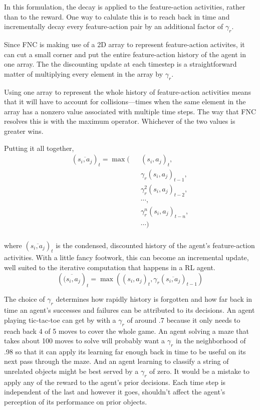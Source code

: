 In this formulation, the decay is applied to the feature-action activities,
rather than to the reward. One way to calulate this is to
reach back in time and incrementally
decay every feature-action pair by an additional factor of $\gamma_r$.

Since FNC is making use of a 2D array to represent
feature-action activites, it can cut a small corner and put the
entire feature-action history of the agent in one array. The the discounting
update at each timestep is a straightforward matter of multiplying
every element in the array by $\gamma_r$.

Using one array to represent the whole history of feature-action activities
means that it will have to account for collisions---times when the same
element in the array has a nonzero value associated with multiple time steps.
The way that FNC resolves this is with the maximum operator. Whichever
of the two values is greater wins.

Putting it all together, 
\begin{eqnarray*}
(\overline{s_i, a_j})_t = \max(&&(s_i, a_j)_t , \\
&&\gamma_r (s_i, a_j)_{t-1},\\
&&\gamma_r^2 (s_i, a_j)_{t-2},\\
&&\cdots,\\
&&\gamma_r^n (s_i, a_j)_{t-n},\\
&&\cdots)\\
\end{eqnarray*}

where $(\overline{s_i, a_j})_t$ is the condensed, discounted history
of the agent's feature-action activities. With a little fancy footwork,
this can become an incremental update, well suited to the iterative computation
that happens in a RL agent.
\begin{equation}
(\overline{(s_i, a_j})_t = \max(
(s_i, a_j)_t , 
\gamma_r (\overline{s_i, a_j})_{t-1})
\end{equation}

The choice of $\gamma_r$ determines how rapidly history is forgotten and
how far back in time an agent's successes and failures can be attributed to its
decisions. An agent playing tic-tac-toe can get by with a $\gamma_r$
of around .7 because it only needs to reach back 4 of 5 moves to cover the
whole game.
An agent solving a maze that takes about 100 moves to solve will
probably want a $\gamma_r$ in the neighborhood of .98 so that it can apply
its learning far enough back in time to be useful on its next pass through
the maze.
And an agent learning to classify a string of unrelated
objects might be best served by a $\gamma_r$ of zero. It would be a mistake
to apply any of the reward to the agent's prior decisions.
Each time step is independent of the last and however it goes, shouldn't
affect the agent's perception of its performance on prior objects.

